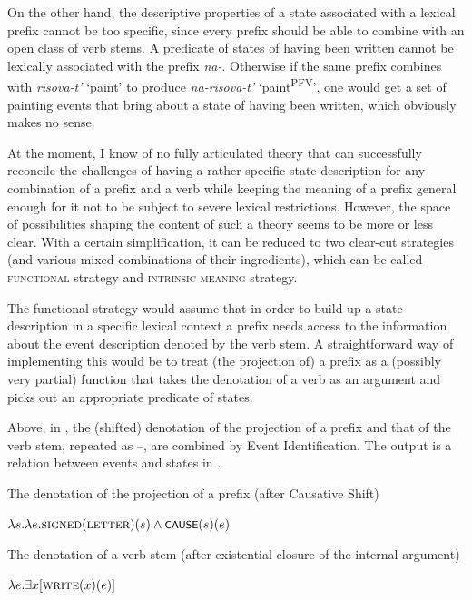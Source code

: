 \documentclass[output=paper,colorlinks,citecolor=brown]{langscibook}
\begin{document}
On the other hand, the descriptive properties of a state associated with a lexical prefix cannot be too specific, since every prefix should be able to combine with an open class of verb stems. A predicate of states of having been written cannot be lexically associated with the prefix \textit{na-}. Otherwise if the same prefix combines with \textit{risova-t’} ‘paint’ to produce \textit{na-risova-t’} ‘paint\textsuperscript{PFV}’, one would get a set of painting events that bring about a state of having been written, which obviously makes no sense. 

At the moment, I know of no fully articulated theory that can successfully reconcile the challenges of having a rather specific state description for any combination of a prefix and a verb while keeping the meaning of a prefix general enough for it not to be subject to severe lexical restrictions. However, the space of possibilities shaping the content of such a theory seems to be more or less clear. With a certain simplification, it can be reduced to two clear-cut strategies (and various mixed combinations of their ingredients), which can be called \textsc{functional} strategy and \textsc{intrinsic meaning} strategy.

The functional strategy would assume that in order to build up a state description in a specific lexical context a prefix needs access to the information about the event description denoted by the verb stem. A straightforward way of implementing this would be to treat (the projection of) a prefix as a (possibly very partial) function that takes the denotation of a verb as an argument and picks out an appropriate predicate of states. 

Above, in , the (shifted) denotation of the projection of a prefix and that of the verb stem, repeated as --, are combined by Event Identification. The output is a relation between events and states in .

\largerpage
\ea\label{ex:tatevosov:112}
\eanoraggedright      The denotation of the projection of a prefix (after Causative Shift)\label{ex:tatevosov:112a}

$\lambda s.\lambda e. \textsc{signed}(\textsc{letter})(s) \wedge \cnst{cause}(s)(e)$

\ex      The denotation of a verb stem (after existential closure of the internal   argument)\label{ex:tatevosov:112b}

$\lambda e. \exists x [\textsc{write}(x)(e)]$
\end{document}
